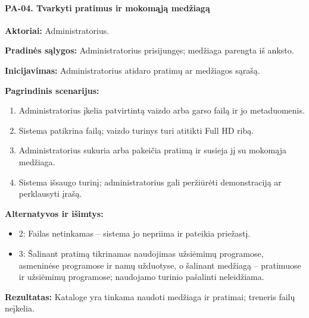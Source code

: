 \paragraph{PA-04. Tvarkyti pratimus ir mokomąją medžiagą}\mbox{}\par
\textbf{Aktoriai:} Administratorius.\par
\textbf{Pradinės sąlygos:} Administratorius prisijungęs; medžiaga parengta iš anksto.\par
\textbf{Inicijavimas:} Administratorius atidaro pratimų ar medžiagos sąrašą.\par
\textbf{Pagrindinis scenarijus:}
\begin{enumerate}
\item Administratorius įkelia patvirtintą vaizdo arba garso failą ir jo metaduomenis.
\item Sistema patikrina failą; vaizdo turinys turi atitikti Full HD ribą.
\item Administratorius sukuria arba pakeičia pratimą ir susieja jį su mokomąja medžiaga.
\item Sistema išsaugo turinį; administratorius gali peržiūrėti demonstraciją ar perklausyti įrašą.
\end{enumerate}
\textbf{Alternatyvos ir išimtys:}
\begin{itemize}
\item 2: Failas netinkamas -- sistema jo nepriima ir pateikia priežastį.
\item 3: Šalinant pratimą tikrinamas naudojimas užsiėmimų programose, asmeninėse programose ir namų užduotyse, o šalinant medžiagą -- pratimuose ir užsiėmimų programose; naudojamo turinio pašalinti neleidžiama.
\end{itemize}
\textbf{Rezultatas:} Kataloge yra tinkama naudoti medžiaga ir pratimai; treneris failų neįkelia.\par
{}
